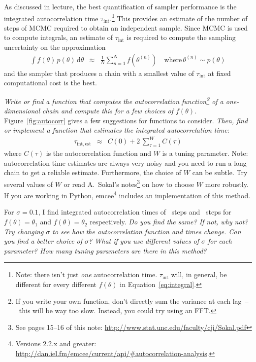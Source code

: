 \documentclass[letterpaper,12pt,preprint]{hack_aastex}
\newcommand{\question}{\emph}
\begin{document}
As discussed in lecture, the best quantification of sampler performance is the
integrated autocorrelation time $\tau_\mathrm{int}$.\footnote{Note: there isn't
just \emph{one} autocorrelation time.
$\tau_\mathrm{int}$ will, in general, be different for every different
$f(\theta)$ in Equation~\ref{eq:integral}.}
This provides an estimate of the number of steps of MCMC required to obtain an
independent sample.
Since MCMC is used to compute integrals, an estimate of $\tau_\mathrm{int}$ is
required to compute the sampling uncertainty on the approximation
\begin{eqnarray}\label{eq:integral}
\int f(\theta)\,p(\theta)\,\mathrm{d}\theta &\approx&
    \frac{1}{N} \sum_{n=1}^N f(\theta^{(n)}) \quad
    \mathrm{where}\,\theta^{(n)} \sim p(\theta)
\end{eqnarray}
and the sampler that produces a chain with a smallest value of
$\tau_\mathrm{int}$ at fixed computational cost is the best.

\question{Write or find a function that computes the autocorrelation
function\footnote{If you write your own function, don't directly sum the
variance at each lag~--~this will be way too slow. Instead, you could try
using an FFT.} of a one-dimensional chain and compute this for a few choices
of $f(\theta)$.} Figure~\ref{fig:autocorr} gives a few suggestions for
functions to consider.
\question{Then, find or implement a function that estimates the integrated
autocorrelation time}:
\begin{eqnarray}
\tau_\mathrm{int,est} &\approx& C(0) + 2\,\sum_{\tau=1}^W C(\tau)
\end{eqnarray}
where $C(\tau)$ is the autocorrelation function and $W$ is a tuning parameter.
Note: autocorrelation time estimates are always very noisy and you need to run
a long chain to get a reliable estimate.
Furthermore, the choice of $W$ can be subtle. Try several values of $W$ or
read A.~Sokal's notes\footnote{See pages 15--16 of this note:
\url{http://www.stat.unc.edu/faculty/cji/Sokal.pdf}} on how to choose $W$ more
robustly.
If you are working in Python, \textsf{emcee}\footnote{Versions 2.2.x and
greater: \url{http://dan.iel.fm/emcee/current/api/\#autocorrelation-analysis}.}
includes an implementation of this method.

For $\sigma = 0.1$, I find integrated autocorrelation times of \taua~steps and
\taub~steps for $f(\theta)=\theta_1$ and $f(\theta)=\theta_2$ respectively.
\question{Do you find the same? If not, why not?
Try changing $\sigma$ to see how the autocorrelation function and times
change.
Can you find a better choice of $\sigma$? What if you use different values of
$\sigma$ for each parameter? How many tuning parameters are there in this
method?}
\end{document}
